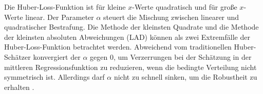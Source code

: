 Die Huber-Loss-Funktion ist für kleine \(x\)-Werte quadratisch und für große \(x\)-Werte linear. Der Parameter $\alpha$ steuert die Mischung zwischen linearer und quadratischer Bestrafung. Die Methode der kleinsten Quadrate und die Methode der kleinsten absoluten Abweichungen (\ac{LAD}) können als zwei Extremfälle der Huber-Loss-Funktion betrachtet werden. Abweichend vom traditionellen Huber-Schätzer konvergiert der $\alpha$ gegen 0, um Verzerrungen bei der Schätzung in der mittleren Regressionsfunktion zu reduzieren, wenn die bedingte Verteilung nicht symmetrisch ist. Allerdings darf $\alpha$ nicht zu schnell sinken, um die Robustheit zu erhalten \cite{indirekthuber}.   
 